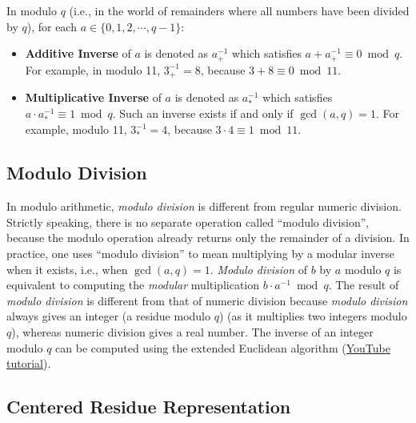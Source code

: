 \begin{tcolorbox}[title={\textbf{\tboxdef{\ref*{subsec:modulo-inverse}} Inverse in Modulo Arithmetic}}]

In modulo $q$ (i.e., in the world of remainders where all numbers have been divided by $q$), for each $a \in \{0, 1, 2, \cdots, q-1\}$:

\begin{itemize}

\item \textbf{Additive Inverse} of $a$ is denoted as $a_+^{-1}$ which satisfies $a + a_+^{-1} \equiv 0 \bmod q$. For example, in modulo 11, $3_+^{-1} = 8$, because $3 + 8 \equiv 0 \bmod 11$.

\item \textbf{Multiplicative Inverse} of $a$ is denoted as $a_*^{-1}$ which satisfies $a \cdot a_*^{-1} \equiv 1 \bmod{q}$. Such an inverse exists if and only if $\gcd(a,q)=1$. For example, modulo 11, $3_*^{-1} = 4$, because $3 \cdot 4 \equiv 1 \bmod{11}$.

\end{itemize}

\end{tcolorbox}

\subsection{Modulo Division}
\label{subsec:modulo-division}

In modulo arithmetic, \textit{modulo division} is different from regular numeric division. Strictly speaking, there is no separate operation called “modulo division”, because the modulo operation already returns only the remainder of a division. In practice, one uses “modulo division” to mean multiplying by a modular inverse when it exists, i.e., when $\gcd(a,q)=1$. \textit{Modulo division} of $b$ by $a$ modulo $q$ is equivalent to computing the \textit{modular} multiplication $b \cdot a^{-1} \bmod q$. The result of \textit{modulo division} is different from that of numeric division because \textit{modulo division} always gives an integer (a residue modulo $q$) (as it multiplies two integers modulo $q$), whereas numeric division gives a real number. The inverse of an integer modulo $q$ can be computed using the extended Euclidean algorithm (\href{https://www.youtube.com/watch?v=fz1vxq5ts5I}{YouTube tutorial}).

\subsection{Centered Residue Representation}
\label{subsec:modulo-centered}

